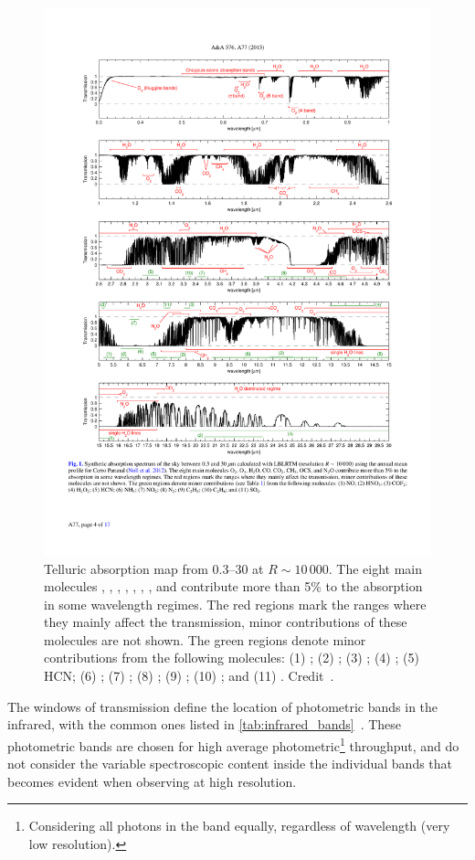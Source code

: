 \begin{figure}
    \centering
    \includegraphics[width=0.9\linewidth]{figures/atmos_and_models/cropped_molecfit_absorption}
    \caption[Telluric absorption map from 0.3--30\um{} at $R\sim10\,000$.]{Telluric absorption map from 0.3--30\um{} at $R\sim10\,000$.
        The eight main molecules , , , , , , , and  contribute more than 5\% to the absorption in some wavelength regimes.
        The red regions mark the ranges where they mainly affect the transmission, minor contributions of these molecules are not shown.
        The green regions denote minor contributions from the following molecules: (1) ; (2) ; (3) ; (4) ; (5) {HCN}; (6) ; (7) ; (8) ; (9) ; (10) ; and (11) .
        Credit~\citet[][Figure~1]{smette_molecfit_2015}.}
    \label{fig:croppedmolecfitabsorbtion}
\end{figure}

The windows of transmission define the location of photometric bands in the infrared, with the common ones listed in \cref{tab:infrared_bands}~\citep[see e.g.][]{sterken_astronomical_1992, binney_galactic_1998}.
These photometric bands are chosen for high average photometric\footnote{Considering all photons in the band equally, regardless of wavelength (very low resolution).} throughput, and do not consider the variable spectroscopic content inside the individual bands that becomes evident when observing at high resolution.

